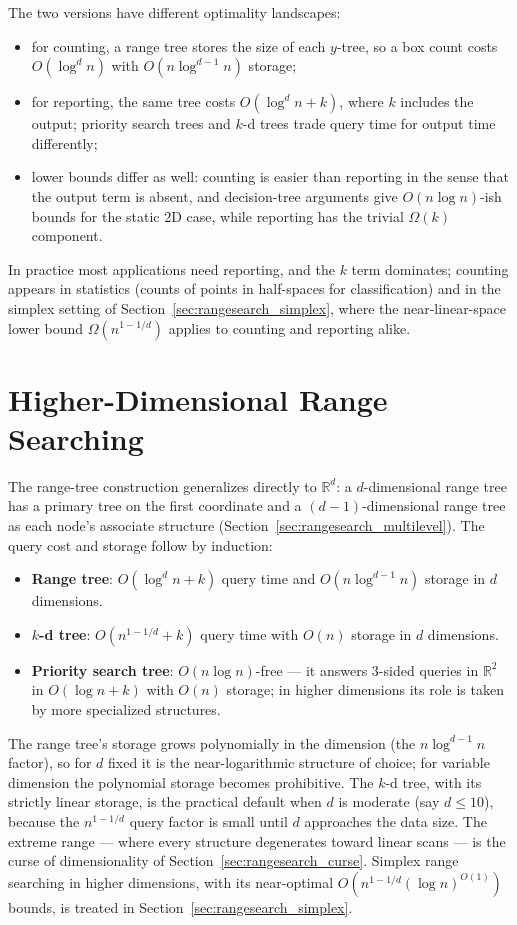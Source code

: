 The two versions have different optimality landscapes:
\begin{itemize}
  \item for counting, a range tree stores the size of each $y$-tree, so a
    box count costs $O(\log^d n)$ with $O(n \log^{d-1} n)$ storage;
  \item for reporting, the same tree costs $O(\log^d n + k)$, where $k$
    includes the output; priority search trees and $k$-d trees trade
    query time for output time differently;
  \item lower bounds differ as well: counting is easier than reporting in
    the sense that the output term is absent, and decision-tree arguments
    give $O(n \log n)$-ish bounds for the static 2D case, while reporting
    has the trivial $\Omega(k)$ component.
\end{itemize}
In practice most applications need reporting, and the $k$ term dominates;
counting appears in statistics (counts of points in half-spaces for
classification) and in the simplex setting of Section~\ref{sec:rangesearch_simplex},
where the near-linear-space lower bound $\Omega(n^{1-1/d})$ applies to
counting and reporting alike.


\section{Higher-Dimensional Range Searching}
\label{sec:rangesearch_higher_dimensional}

The range-tree construction generalizes directly to $\mathbb{R}^d$: a
$d$-dimensional range tree has a primary tree on the first coordinate and
a $(d-1)$-dimensional range tree as each node's associate structure
(Section~\ref{sec:rangesearch_multilevel}). The query cost and storage
follow by induction:
\begin{itemize}
  \item \textbf{Range tree}: $O(\log^d n + k)$ query time and
    $O(n \log^{d-1} n)$ storage in $d$ dimensions.
  \item \textbf{$k$-d tree}: $O(n^{1-1/d} + k)$ query time with $O(n)$
    storage in $d$ dimensions.
  \item \textbf{Priority search tree}: $O(n \log n)$-free --- it answers
    3-sided queries in $\mathbb{R}^2$ in $O(\log n + k)$ with $O(n)$
    storage; in higher dimensions its role is taken by more specialized
    structures.
\end{itemize}
The range tree's storage grows polynomially in the dimension (the
$n\log^{d-1} n$ factor), so for $d$ fixed it is the near-logarithmic
structure of choice; for variable dimension the polynomial storage becomes
prohibitive. The $k$-d tree, with its strictly linear storage, is the
practical default when $d$ is moderate (say $d \le 10$), because the
$n^{1-1/d}$ query factor is small until $d$ approaches the data size. The
extreme range --- where every structure degenerates toward linear scans ---
is the curse of dimensionality of Section~\ref{sec:rangesearch_curse}.
Simplex range searching in higher dimensions, with its near-optimal
$O(n^{1-1/d}(\log n)^{O(1)})$ bounds, is treated in
Section~\ref{sec:rangesearch_simplex}.

